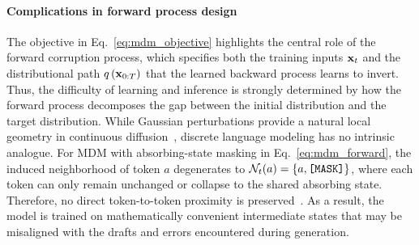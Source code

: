 \paragraph{Complications in forward process design}
The objective in Eq.~\eqref{eq:mdm_objective} highlights the central role of the forward corruption process, which specifies both the training inputs $\mathbf{x}_t$ and the distributional path $q\left(\mathbf{x}_{0:T}\right)$ that the learned backward process learns to invert. 
Thus, the difficulty of learning and inference is strongly determined by how the forward process decomposes the gap between the initial distribution and the target distribution. 
While Gaussian perturbations provide a natural local geometry in continuous diffusion~\citep{ddpm,score-based}, discrete language modeling has no intrinsic analogue. 
For MDM with absorbing-state masking in Eq.~\eqref{eq:mdm_forward}, the induced neighborhood of token $a$ degenerates to $\mathcal{N}_t(a)=\left\{a,\texttt{[MASK]}\right\}$, where each token can only remain unchanged or collapse to the shared absorbing state. Therefore, no direct token-to-token proximity is preserved~\citep{SCUD, mdpo}. 
As a result, the model is trained on mathematically convenient intermediate states that may be misaligned with the drafts and errors encountered during generation. 
